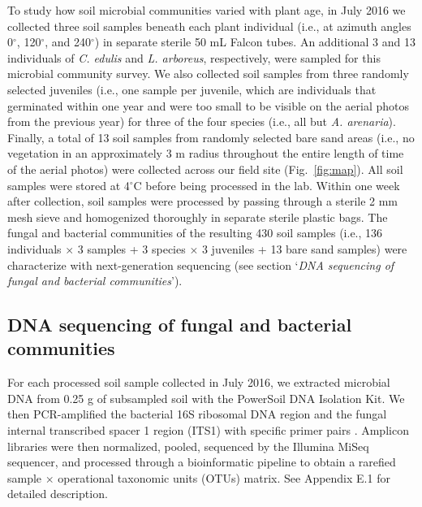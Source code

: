 To study how soil microbial communities varied with plant age, in July 2016 we collected three soil samples beneath each plant individual (i.e., at azimuth angles 0$^{\circ}$, 120$^{\circ}$, and 240$^{\circ}$) in separate sterile 50 mL Falcon tubes. 
An additional 3 and 13 individuals of \textit{C. edulis} and \textit{L. arboreus}, respectively, were sampled for this microbial community survey. We also collected soil samples from three randomly selected juveniles (i.e., one sample per juvenile, which are individuals that germinated within one year and were too small to be visible on the aerial photos from the previous year) for three of the four species (i.e., all but \textit{A. arenaria}). Finally, a total of 13 soil samples from randomly selected bare sand areas (i.e., no vegetation in an approximately 3 m radius throughout the entire length of time of the aerial photos) were collected across our field site (Fig.~\ref{fig:map}). 
All soil samples were stored at 4$^{\circ}$C before being processed in the lab. Within one week after collection, soil samples were processed by passing through a sterile 2 mm mesh sieve and homogenized thoroughly in separate sterile plastic bags.
The fungal and bacterial communities of the resulting 430 soil samples (i.e., 136 individuals $\times$ 3 samples + 3 species $\times$ 3 juveniles + 13 bare sand samples) were characterize with next-generation sequencing (see section `\textit{DNA sequencing of fungal and bacterial communities}').
\par



\subsection*{DNA sequencing of fungal and bacterial communities}
For each processed soil sample collected in July 2016, we extracted microbial DNA from 0.25 g of subsampled soil with the PowerSoil DNA Isolation Kit. We then PCR-amplified the bacterial 16S ribosomal DNA region and the fungal internal transcribed spacer 1 region (ITS1) with specific primer pairs \citep{Caporaso2012, Toju2012, Lundberg2013, Hamady2008}. Amplicon libraries were then normalized, pooled, sequenced by the Illumina MiSeq sequencer, and processed through a bioinformatic pipeline \citep{Wang2007, Edgar2011, McMurdie2013, Tanabe2013, Zhang2014, Deshpande2016, Rognes2016, Davis2018} to obtain a rarefied sample $\times$ operational taxonomic units (OTUs) matrix. See Appendix E.1 for detailed description.
\par



